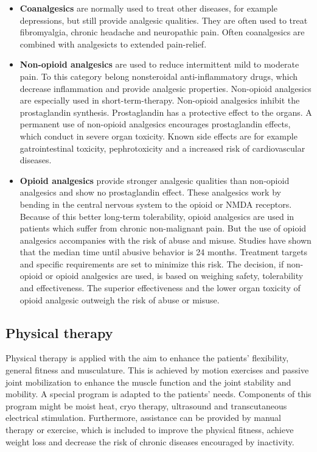 \begin{itemize}
\item \textbf{Coanalgesics} are normally used to treat other diseases, for example depressions, but still provide analgesic qualities. They are often used to treat fibromyalgia, chronic headache and neuropathic pain. Often coanalgesics are combined with analgesicts to extended pain-relief. \cite{marcus2009}

\item \textbf{Non-opioid analgesics} are used to reduce intermittent mild to moderate pain. To this category belong nonsteroidal anti-inflammatory drugs, which decrease inflammation and provide analgesic properties. Non-opioid analgesics are especially used in short-term-therapy. Non-opioid analgesics inhibit the prostaglandin synthesis. Prostaglandin has a protective effect to the organs. A permanent use of non-opioid analgesics encourages prostaglandin effects, which conduct in severe organ toxicity. Known side effects are for example gatrointestinal toxicity, pephrotoxicity and a increased risk of cardiovascular diseases. \cite{marcus2009,stein2007}

\item \textbf{Opioid analgesics} provide stronger analgesic qualities than non-opioid analgesics and show no prostaglandin effect. These analgesics work by bending in the central nervous system to the opioid or NMDA receptors.  Because of this better long-term tolerability, opioid analgesics are used in patients which suffer from chronic non-malignant pain. But the use of opioid analgesics accompanies with the risk of abuse and misuse. Studies have shown that the median time until abusive behavior is 24 months. Treatment targets and specific requirements are set to minimize this risk. \cite{marcus2009,stein2007}
The decision, if non-opioid or opioid analgesics are used, is based on weighing safety, tolerability and effectiveness. The superior effectiveness and the lower organ toxicity of opioid analgesic outweigh the risk of abuse or misuse. \cite{marcus2009} 
\end{itemize}

\subsection{Physical therapy}
Physical therapy is applied with the aim to enhance the patients' flexibility, general fitness and musculature. This is achieved by motion exercises and passive joint mobilization to enhance the muscle function and the joint stability and mobility. A special program is adapted to the patients' needs. Components of this program might be moist heat, cryo therapy, ultrasound and transcutaneous electrical stimulation. Furthermore, assistance can be provided by manual therapy or exercise, which is included to improve the physical fitness, achieve weight loss and decrease the risk of chronic diseases encouraged by inactivity. \cite{marcus2009,pope2017}

